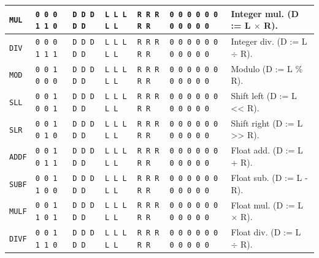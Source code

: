 \documentclass[a5paper]{report}
\begin{document}
{\begin{center}
\begin{tabular}[ht]{
	| p{} | p{} | p{} | p{}
	| p{} | p{} | p{} |
}
	\texttt{MUL} & \texttt{0 0 0 1 1 0} & \texttt{D D D D D} & \texttt{L L L L L} & \texttt{R R R R R} &
		\texttt{0 0 0 0 0 0 0 0 0 0 0} & Integer mul. (D := L $\times$ R). \\
	\hline
	
	\texttt{DIV} & \texttt{0 0 0 1 1 1} & \texttt{D D D D D} & \texttt{L L L L L} & \texttt{R R R R R} &
		\texttt{0 0 0 0 0 0 0 0 0 0 0} & Integer div. (D := L $\div$ R). \\
	\hline
	
	\texttt{MOD} & \texttt{0 0 1 0 0 0} & \texttt{D D D D D} & \texttt{L L L L L} & \texttt{R R R R R} &
		\texttt{0 0 0 0 0 0 0 0 0 0 0} & Modulo (D := L \% R). \\
	\hline
	
	\texttt{SLL} & \texttt{0 0 1 0 0 1} & \texttt{D D D D D} & \texttt{L L L L L} & \texttt{R R R R R} &
		\texttt{0 0 0 0 0 0 0 0 0 0 0} & Shift left (D := L << R). \\
	\hline
	
	\texttt{SLR} & \texttt{0 0 1 0 1 0} & \texttt{D D D D D} & \texttt{L L L L L} & \texttt{R R R R R} &
		\texttt{0 0 0 0 0 0 0 0 0 0 0} & Shift right (D := L >> R). \\
	\hline
	
	\texttt{ADDF} & \texttt{0 0 1 0 1 1} & \texttt{D D D D D} & \texttt{L L L L L} & \texttt{R R R R R} &
		\texttt{0 0 0 0 0 0 0 0 0 0 0} & Float add. (D := L + R). \\
	\hline
	
	\texttt{SUBF} & \texttt{0 0 1 1 0 0} & \texttt{D D D D D} & \texttt{L L L L L} & \texttt{R R R R R} &
		\texttt{0 0 0 0 0 0 0 0 0 0 0} & Float sub. (D := L - R). \\
	\hline
	
	\texttt{MULF} & \texttt{0 0 1 1 0 1} & \texttt{D D D D D} & \texttt{L L L L L} & \texttt{R R R R R} &
		\texttt{0 0 0 0 0 0 0 0 0 0 0} & Float mul. (D := L $\times$ R). \\
	\hline
	
	\texttt{DIVF} & \texttt{0 0 1 1 1 0} & \texttt{D D D D D} & \texttt{L L L L L} & \texttt{R R R R R} &
		\texttt{0 0 0 0 0 0 0 0 0 0 0} & Float div. (D := L $\div$ R). \\
	\hline
\end{tabular}
\end{center}
}
\end{document}
